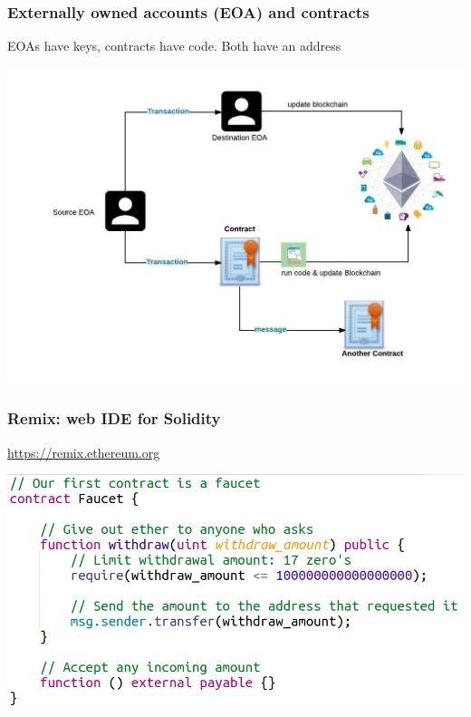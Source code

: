 \documentclass[11pt]{beamer}  %
\begin{document}
\begin{frame}\frametitle{Externally owned accounts (EOA) and contracts}

  \begin{greenbox}{}
    EOAs have keys, contracts have code. Both have an address
  \end{greenbox}
  
  \begin{center}
    \includegraphics[scale=0.35,clip=false]{pictures/eoa-contract.jpg}
  \end{center}

\end{frame}

\begin{frame}\frametitle{Remix: web IDE for Solidity}

  \begin{greenbox}{}
    \url{https://remix.ethereum.org}
  \end{greenbox}

  \begin{center}
    \includegraphics[width=\textwidth,clip=false]{pictures/faucet_sol.png}
  \end{center}

\end{frame}
\end{document}
